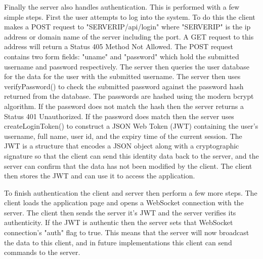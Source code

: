 \documentclass[10pt,technote]{IEEEtran}
\begin{document}
\par
Finally the server also handles authentication. This is performed with a few simple steps. First the user attempts to log into the system. To do this the client makes a POST request to "SERVERIP/api/login" where "SERVERIP" is the ip address or domain name of the server including the port. A GET request to this address will return a Status 405 Method Not Allowed. The POST request contains two form fields: "uname" and "password" which hold the submitted username and password respectively. The server then queries the user database for the data for the user with the submitted username. The server then uses verifyPassword() to check the submitted password against the password hash returned from the database. The passwords are hashed using the modern bcrypt algorithm. If the password does not match the hash then the server returns a Status 401 Unauthorized. If the password does match then the server uses createLoginToken() to construct a JSON Web Token (JWT) containing the user's username, full name, user id, and the expiry time of the current session. The JWT is a structure that encodes a JSON object along with a cryptographic signature so that the client can send this identity data back to the server, and the server can confirm that the data has not been modified by the client. The client then stores the JWT and can use it to access the application.
\par
To finish authentication the client and server then perform a few more steps. The client loads the application page and opens a WebSocket connection with the server. The client then sends the server it's JWT and the server verifies its authenticity. If the JWT is authentic then the server sets that WebSocket connection's "auth" flag to true. This means that the server will now broadcast the data to this client, and in future implementations this client can send commands to the server.
\end{document}
